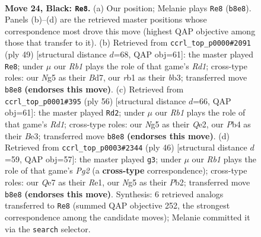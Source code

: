 \documentclass[11pt]{article}
\begin{document}
\clearpage

\begin{figure}[p]\centering
\begin{subfigure}{0.46\textwidth}\centering
\resizebox{\linewidth}{!}{%
\newchessgame
\chessboard[
  setfen={1r4k1/p1ppq1pp/5p2/6n1/1pPP4/P2Q4/2P1BP1P/1R4K1 b - - 0 24},
  showmover=false,
  pgfstyle=straightmove, color=movearrow, markmove={b8-e8}
]}
\caption{}
\end{subfigure}\hfill
\begin{subfigure}{0.46\textwidth}\centering
\resizebox{\linewidth}{!}{%
\newchessgame
\chessboard[
  setfen={3r2k1/p2b1p1p/1qpp2p1/7P/8/1BQ2PP1/PPP5/2K1R3 b - - 0 25},
  showmover=false,
  pgfstyle=straightmove, color=movearrow, markmove={d8-e8}
]}
\caption{}
\end{subfigure}
\\[4pt]
\begin{subfigure}{0.46\textwidth}\centering
\resizebox{\linewidth}{!}{%
\newchessgame
\chessboard[
  setfen={4r1k1/pb1q1ppp/1p1P4/2P2p2/5P2/2P1B3/P3Q1PP/3R2K1 w - - 1 29},
  showmover=false,
  pgfstyle=straightmove, color=movearrow, markmove={d1-d2}
]}
\caption{}
\end{subfigure}\hfill
\begin{subfigure}{0.46\textwidth}\centering
\resizebox{\linewidth}{!}{%
\newchessgame
\chessboard[
  setfen={5rk1/2p1bppp/p3P3/1pq5/8/1QN5/PP3PPP/4R1K1 w - - 3 24},
  showmover=false,
  pgfstyle=straightmove, color=movearrow, markmove={g2-g3}
]}
\caption{}
\end{subfigure}
\caption{\textbf{Move 24, Black: \texttt{Re8}.} (a) Our position; Melanie plays \texttt{Re8} (\texttt{b8e8}). Panels (b)--(d) are the retrieved master positions whose correspondence most drove this move (highest QAP objective among those that transfer to it). (b) Retrieved from \texttt{ccrl\_top\_p0000\#2091} (ply 49) [structural distance $d$=68, QAP obj=61]: the master played \texttt{Re8}; under $\mu$ our \emph{Rb1} plays the role of that game's \emph{Rd1}; cross-type roles: our \emph{N}g5 as their \emph{B}d7, our \emph{r}b1 as their \emph{b}b3; transferred move \texttt{b8e8} \textbf{(endorses this move)}. (c) Retrieved from \texttt{ccrl\_top\_p0001\#395} (ply 56) [structural distance $d$=66, QAP obj=61]: the master played \texttt{Rd2}; under $\mu$ our \emph{Rb1} plays the role of that game's \emph{Rd1}; cross-type roles: our \emph{N}g5 as their \emph{Q}e2, our \emph{P}b4 as their \emph{B}e3; transferred move \texttt{b8e8} \textbf{(endorses this move)}. (d) Retrieved from \texttt{ccrl\_top\_p0003\#2344} (ply 46) [structural distance $d$=59, QAP obj=57]: the master played \texttt{g3}; under $\mu$ our \emph{Rb1} plays the role of that game's \emph{Pg2} (a \textbf{cross-type} correspondence); cross-type roles: our \emph{Q}e7 as their \emph{R}e1, our \emph{N}g5 as their \emph{P}b2; transferred move \texttt{b8e8} \textbf{(endorses this move)}. Synthesis: 6 retrieved analogs transferred to \texttt{Re8} (summed QAP objective 252, the strongest correspondence among the candidate moves); Melanie committed it via the \texttt{search} selector.}
\label{fig:thought-m47}
\end{figure}
\end{document}
